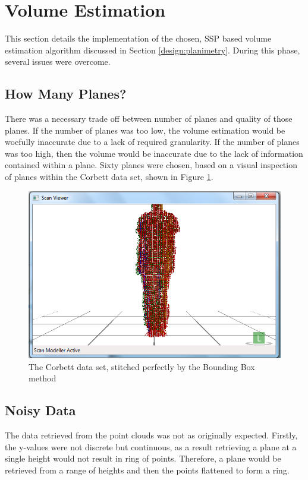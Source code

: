 \section{Volume Estimation}
This section details the implementation of the chosen, SSP based volume estimation algorithm discussed in Section \ref{design:planimetry}. During this phase, several issues were overcome. \\

\subsection{How Many Planes?}
There was a necessary trade off between number of planes and quality of those planes. If the number of planes was too low, the volume estimation would be woefully inaccurate due to a lack of required granularity. If the number of planes was too high, then the volume would be inaccurate due to the lack of information contained within a plane. Sixty planes were chosen, based on a visual inspection of planes within the Corbett data set, shown in Figure \ref{fig:the_corbett_data_set}.\\

\begin{figure}[htb]
\begin{center}
\includegraphics[scale=0.4]{images/corbett_dataset} 
\end{center}
\caption{The Corbett data set, stitched perfectly by the Bounding Box method}
\label{fig:the_corbett_data_set}
\end{figure}

\subsection{Noisy Data}
The data retrieved from the point clouds was not as originally expected. Firstly, the y-values were not discrete but continuous, as a result retrieving a plane at a single height would not result in ring of points. Therefore, a plane would be retrieved from a range of heights and then the points flattened to form a ring.\\

